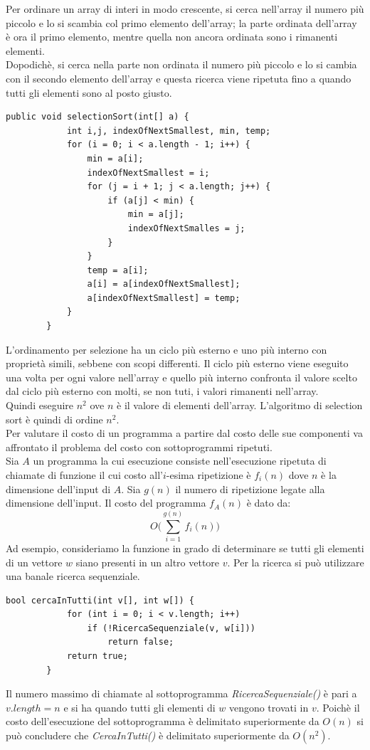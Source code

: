 \documentclass[12pt]{report}
\begin{document}
   	Per ordinare un array di interi in modo crescente, si cerca nell'array il numero più piccolo e lo si scambia col primo elemento dell'array; la parte ordinata dell'array è ora il primo elemento, mentre quella non ancora ordinata sono i rimanenti elementi. \\
   	Dopodichè, si cerca nella parte non ordinata il numero più piccolo e lo si cambia con il secondo elemento dell'array e questa ricerca viene ripetuta fino a quando tutti gli elementi sono al posto giusto.
   	\begin{lstlisting}[style=cppstyle]
   		public void selectionSort(int[] a) {
   			int i,j, indexOfNextSmallest, min, temp;
   			for (i = 0; i < a.length - 1; i++) {
   				min = a[i];
   				indexOfNextSmallest = i;
   				for (j = i + 1; j < a.length; j++) {
   					if (a[j] < min) {
   						min = a[j];
   						indexOfNextSmalles = j;
   					}
   				}
   				temp = a[i];
   				a[i] = a[indexOfNextSmallest];
   				a[indexOfNextSmallest] = temp;
   			}
   		}
   	\end{lstlisting}
   	L'ordinamento per selezione ha un ciclo più esterno e uno più interno con proprietà simili, sebbene con scopi differenti. Il ciclo più esterno viene eseguito una volta per ogni valore nell'array e quello più interno confronta il valore scelto dal ciclo più esterno con molti, se non tuti, i valori rimanenti nell'array. \\
   	Quindi eseguire $n^2$ ove $n$ è il valore di elementi dell'array. L'algoritmo di selection sort è quindi di ordine $n^2$. \\
   	Per valutare il costo di un programma a partire dal costo delle sue componenti va affrontato il problema del costo con sottoprogrammi ripetuti. \\
   	Sia $A$ un programma la cui esecuzione consiste nell'esecuzione ripetuta di chiamate di funzione il cui costo all'$i$-esima ripetizione è $f_i(n)$ dove $n$ è la dimensione dell'input di $A$. Sia $g(n)$ il numero di ripetizione legate alla dimensione dell'input. Il costo del programma $f_A(n)$ è dato da:
   	\[
   	O\Bigg(\sum_{i=1}^{g(n)}f_i(n)\Bigg)
   	\]
   	Ad esempio, consideriamo la funzione in grado di determinare se tutti gli elementi di un vettore $w$ siano presenti in un altro vettore $v$. Per la ricerca si può utilizzare una banale ricerca sequenziale.
   	\begin{lstlisting}[style=cppstyle]
   		bool cercaInTutti(int v[], int w[]) {
   			for (int i = 0; i < v.length; i++)
   				if (!RicercaSequenziale(v, w[i]))
   					return false;
   			return true;
   		}
   	\end{lstlisting}
   	Il numero massimo di chiamate al sottoprogramma \textit{RicercaSequenziale()} è pari a $v.length = n$ e si ha quando tutti gli elementi di $w$ vengono trovati in $v$. Poichè il costo dell'esecuzione del sottoprogramma è delimitato superiormente da $O(n)$ si può concludere che \textit{CercaInTutti()} è delimitato superiormente da $O(n^2)$.
\end{document}
